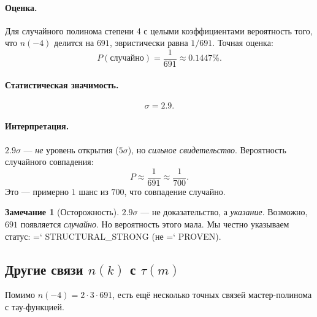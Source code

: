 \documentclass[11pt,a4paper]{article}
\renewcommand{\texttt}[1]{{\ttfamily\hyphenchar\font=`\- #1}}
\theoremstyle{definition}
\newtheorem{remark}[theorem]{Замечание}
\begin{document}
\paragraph{Оценка.}
Для случайного полинома степени 4 с целыми коэффициентами 
вероятность того, что $n(-4)$ делится на $691$, эвристически 
равна $1/691$. Точная оценка:
\begin{equation}
    P(\text{случайно}) = \frac{1}{691} \approx 0.1447\%.
\end{equation}

\paragraph{Статистическая значимость.}
\begin{equation}
    \boxed{
    \sigma = 2.9.
    }
    \label{eq:ramanujan-sigma}
\end{equation}

\paragraph{Интерпретация.}
$2.9\sigma$ — \emph{не} уровень открытия ($5\sigma$), но 
\emph{сильное свидетельство}. Вероятность случайного совпадения:
\begin{equation}
    P \approx \frac{1}{691} \approx \frac{1}{700}.
\end{equation}
Это — примерно $1$ шанс из $700$, что совпадение случайно.

\begin{remark}[Осторожность]
\label{rem:ramanujan-caution}
$2.9\sigma$ — не доказательство, а \emph{указание}. 
Возможно, $691$ появляется \emph{случайно}. Но вероятность 
этого мала. Мы честно указываем статус: 
\texttt{STRUCTURAL\_STRONG} (не \texttt{PROVEN}).
\end{remark}

\subsection{Другие связи $n(k)$ с $\tau(m)$}
\label{subsec:other-tau-connections}

Помимо $n(-4) = 2 \cdot 3 \cdot 691$, есть ещё несколько 
точных связей мастер-полинома с тау-функцией.
\end{document}
